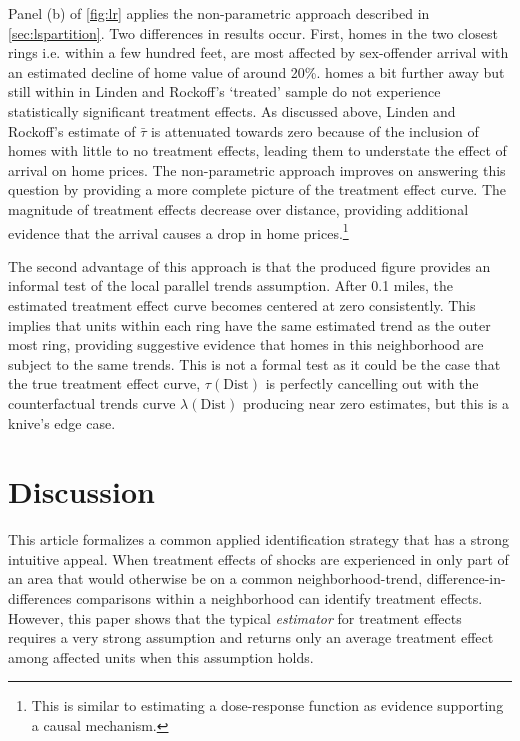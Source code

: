 \documentclass[10pt]{article}
\newcommand{\dist}{\text{Dist}}
\begin{document}
Panel (b) of \autoref{fig:lr} applies the non-parametric approach described in \autoref{sec:lspartition}. Two differences in results occur. First, homes in the two closest rings i.e. within a few hundred feet, are most affected by sex-offender arrival with an estimated decline of home value of around 20\%. homes a bit further away but still within in Linden and Rockoff's `treated' sample do not experience statistically significant treatment effects. As discussed above, Linden and Rockoff's estimate of $\bar{\tau}$ is attenuated towards zero because of the inclusion of homes with little to no treatment effects, leading them to understate the effect of arrival on home prices. The non-parametric approach improves on answering this question by providing a more complete picture of the treatment effect curve. The magnitude of treatment effects decrease over distance, providing additional evidence that the arrival causes a drop in home prices.\footnote{This is similar to estimating a dose-response function as evidence supporting a causal mechanism.} 

The second advantage of this approach is that the produced figure provides an informal test of the local parallel trends assumption. After 0.1 miles, the estimated treatment effect curve becomes centered at zero consistently. This implies that units within each ring have the same estimated trend as the outer most ring, providing suggestive evidence that homes in this neighborhood are subject to the same trends. This is not a formal test as it could be the case that the true treatment effect curve, $\tau(\dist)$ is perfectly cancelling out with the counterfactual trends curve $\lambda(\dist)$ producing near zero estimates, but this is a knive's edge case. 



\section{Discussion}

This article formalizes a common applied identification strategy that has a strong intuitive appeal. When treatment effects of shocks are experienced in only part of an area that would otherwise be on a common neighborhood-trend, difference-in-differences comparisons within a neighborhood can identify treatment effects. However, this paper shows that the typical \emph{estimator} for treatment effects requires a very strong assumption and returns only an average treatment effect among affected units when this assumption holds. 
\end{document}
